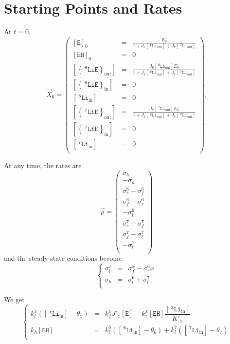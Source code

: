 \documentclass[aps,onecolumn,11pt]{revtex4}
\newcommand{\mychem}[1]{\mathtt{#1}}
\newcommand{\myconc}[1]{\left\lbrack{#1}\right\rbrack}
\newcommand{\spLi}[1]{{~^{\mychem{#1}}\mychem{Li}}}
\newcommand{\spEout}{\mychem{E}}
\newcommand{\Eout}{\myconc{\spEout}}
\newcommand{\spLiEin}[1]{\left\lbrace\spLi{#1}\spEout\right\rbrace_{\mathrm{in}}}
\newcommand{\LiEin}[1]{\myconc{\spLiEin{#1}}}
\newcommand{\spLiEout}[1]{\left\lbrace\spLi{#1}\spEout\right\rbrace_{\mathrm{out}}}
\newcommand{\LiEout}[1]{\myconc{\spLiEout{#1}}}
\newcommand{\spLiIn}[1]{{\spLi{#1}}_{\mathrm{in}}}
\newcommand{\LiIn}[1]{\myconc{\spLiIn{#1}}}
\newcommand{\spLiOut}[1]{{\spLi{#1}}_{\mathrm{out}}}
\newcommand{\LiOut}[1]{\myconc{\spLiOut{#1}}}
\newcommand{\spEHin}{\mychem{EH}}
\newcommand{\EHin}{\myconc{\spEHin}}
\begin{document}
\section{Starting Points and Rates}

At $t=0$,
\begin{equation}
	\vec{X}_0 = 
	\begin{pmatrix}
	\Eout_0    & = & \frac{E_0}{1+J_6 \LiOut{6} + J_7 \LiOut{7}}  \\
	\EHin_0    & = & 0 \\
	\LiEout{6} & = & \frac{J_6 \LiOut{6} E_0} {1+J_6 \LiOut{6} + J_7 \LiOut{7}} \\
	\LiEin{6}  & = & 0 \\
	\LiIn{6}   & = & 0 \\
	\LiEout{7} & = & \frac{J_7 \LiOut{7} E_0} {1+J_6 \LiOut{6} + J_7 \LiOut{7}}   \\
	\LiEin{7}  & = & 0 \\
	\LiIn{7}   & = & 0 \\
	\end{pmatrix}.
\end{equation}

At any time, the rates are
\begin{equation}
\vec{\rho} = 
\begin{pmatrix}
	\sigma_h\\
	-\sigma_h\\
	\sigma_r^6-\sigma_f^6\\
	\sigma_f^6-\sigma_r^6\\
	-\sigma_l^6\\
	\sigma_r^7-\sigma_f^7\\
	\sigma_f^7-\sigma_r^7\\
	-\sigma_l^7\\
\end{pmatrix}
\end{equation}
and the steady state conditions become
\begin{equation}
	\left\lbrace
	\begin{array}{rcl}
		\sigma_l^x & = & \sigma_f^x - \sigma_r^6x\\
		\sigma_h   & = & \sigma_l^6 + \sigma_l^7\\
	\end{array}
	\right.
\end{equation}

We get
\begin{equation}
\left\lbrace
	\begin{array}{rcl}
	k_l^x \left(\LiIn{x}-\theta_x\right) & = & k_f^x J'_x \Eout - k_r^x \EHin \dfrac{\LiIn{x}}{K'_x}\\
	k_h \EHin & = & k_l^6 \left(\LiIn{6}-\theta_6\right) + k_l^7 \left(\LiIn{7}-\theta_7\right)\\
	\end{array}
\right.
\end{equation}
\end{document}

